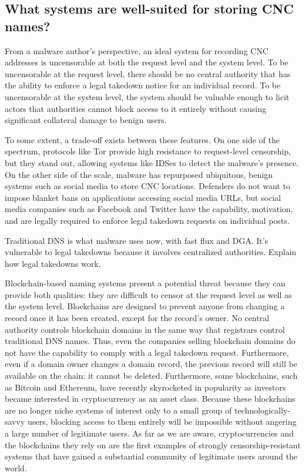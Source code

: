 \documentclass[10pt,sigconf,letterpaper]{acmart}
\newcommand{\randall}{\ding{110}\ding{43}\textcolor{magenta}}
\newcommand{\randall}{}
\begin{document}
\subsection{What systems are well-suited for storing CNC names?}

From a malware author's perspective, an ideal system for recording CNC 
addresses is uncensorable at both the request level and the system level. To be 
uncensorable at the request level, there should be no central authority that 
has the ability to enforce a legal takedown notice for an individual record. To 
be uncensorable at the system level, the system should be valuable enough to 
licit actors that authorities cannot block access to it entirely without 
causing significant collateral damage to benign users.

To some extent, a trade-off exists between these features. On 
one side of the 
spectrum, protocols like Tor provide high resistance to request-level 
censorship, but they stand out, allowing systems like IDSes to detect the 
malware's presence.
On the other side of 
the scale, malware has repurposed ubiquitous, benign systems 
such as social media to store CNC locations. Defenders do not 
want to impose blanket bans on applications accessing social 
media URLs, but social media companies such as Facebook and 
Twitter have the capability, motivation, and are legally required to enforce 
legal takedown requests on individual posts. 

Traditional DNS is what malware uses now, with fast flux and DGA. It’s 
vulnerable to legal takedowns because it involves centralized 
authorities. Explain how legal takedowns work.

Blockchain-based naming systems present a potential threat 
because they can provide 
both qualities: they are difficult to censor at the request 
level as well as the system level. Blockchains are designed 
to prevent anyone from changing a record once it has been 
created, except for the record's owner. No central authority 
controls blockchain domains in the same way that registrars 
control traditional DNS names. Thus, even the companies 
selling blockchain domains do not have the capability to 
comply with a legal takedown request. Furthermore, even if a 
domain owner changes a domain record, the previous record 
will still be available on the chain: it cannot be deleted. 
Furthermore, some blockchains, such as Bitcoin and Ethereum, have recently 
skyrocketed in popularity as investors became interested in cryptocurrency as 
an asset class. Because these blockchains are no longer niche systems of 
interest only to a small group of technologically-savvy users, blocking access 
to them entirely will be impossible without angering a large number of 
legitimate users. As far as we are aware, cryptocurrencies and the blockchains 
they rely on are the first examples of strongly censorship-resistant systems 
that have gained a substantial community of legitimate users around the world.
\end{document}
